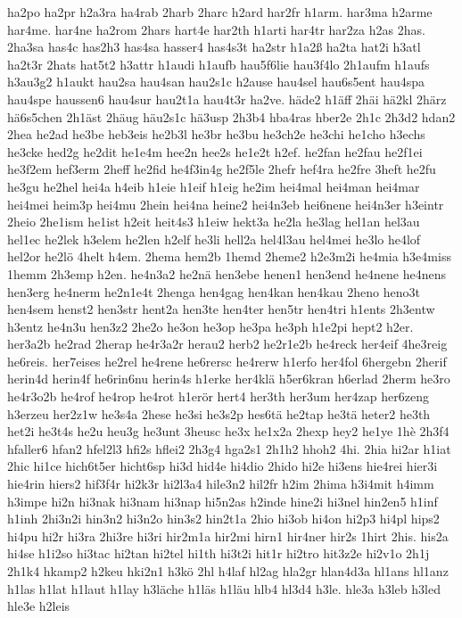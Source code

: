 {ha2po
ha2pr
h2a3ra
ha4rab
2harb
2harc
h2ard
har2fr
h1arm.
har3ma
h2arme
har4me.
har4ne
ha2rom
2hars
hart4e
har2th
h1arti
har4tr
har2za
h2as
2has.
2ha3sa
has4c
has2h3
has4sa
hasser4
has4s3t
ha2str
h1a2ß
ha2ta
hat2i
h3atl
ha2t3r
2hats
hat5t2
h3attr
h1audi
h1aufb
hau5f6lie
hau3f4lo
2h1aufm
h1aufs
h3au3g2
h1aukt
hau2sa
hau4san
hau2s1c
h2ause
hau4sel
hau6s5ent
hau4spa
hau4spe
haussen6
hau4sur
hau2t1a
hau4t3r
ha2ve.
häde2
h1äff
2häi
hä2kl
2härz
hä6s5chen
2h1äst
2häug
häu2s1c
hä3usp
2h3b4
hba4ras
hber2e
2h1c
2h3d2
hdan2
2hea
he2ad
he3be
heb3eis
he2b3l
he3br
he3bu
he3ch2e
he3chi
he1cho
h3echs
he3cke
hed2g
he2dit
he1e4m
hee2n
hee2s
he1e2t
h2ef.
he2fan
he2fau
he2f1ei
he3f2em
hef3erm
2heff
he2fid
he4f3in4g
he2f5le
2hefr
hef4ra
he2fre
3heft
he2fu
he3gu
he2hel
hei4a
h4eib
h1eie
h1eif
h1eig
he2im
hei4mal
hei4man
hei4mar
hei4mei
heim3p
hei4mu
2hein
hei4na
heine2
hei4n3eb
hei6nene
hei4n3er
h3eintr
2heio
2he1ism
he1ist
h2eit
heit4s3
h1eiw
hekt3a
he2la
he3lag
hel1an
hel3au
hel1ec
he2lek
h3elem
he2len
h2elf
he3li
hell2a
hel4l3au
hel4mei
he3lo
he4lof
hel2or
he2lö
4helt
h4em.
2hema
hem2b
1hemd
2heme2
h2e3m2i
he4mia
h3e4miss
1hemm
2h3emp
h2en.
he4n3a2
he2nä
hen3ebe
henen1
hen3end
he4nene
he4nens
hen3erg
he4nerm
he2n1e4t
2henga
hen4gag
hen4kan
hen4kau
2heno
heno3t
hen4sem
henst2
hen3str
hent2a
hen3te
hen4ter
hen5tr
hen4tri
h1ents
2h3entw
h3entz
he4n3u
hen3z2
2he2o
he3on
he3op
he3pa
he3ph
h1e2pi
hept2
h2er.
her3a2b
he2rad
2herap
he4r3a2r
herau2
herb2
he2r1e2b
he4reck
her4eif
4he3reig
he6reis.
her7eises
he2rel
he4rene
he6rersc
he4rerw
h1erfo
her4fol
6hergebn
2herif
herin4d
herin4f
he6rin6nu
herin4s
h1erke
her4klä
h5er6kran
h6erlad
2herm
he3ro
he4r3o2b
he4rof
he4rop
he4rot
h1erör
hert4
her3th
her3um
her4zap
her6zeng
h3erzeu
her2z1w
he3s4a
2hese
he3si
he3s2p
hes6tä
he2tap
he3tä
heter2
he3th
het2i
he3t4s
he2u
heu3g
he3unt
3heusc
he3x
he1x2a
2hexp
hey2
he1ye
1hè
2h3f4
hfaller6
hfan2
hfel2l3
hfi2s
hflei2
2h3g4
hga2s1
2h1h2
hhoh2
4hi.
2hia
hi2ar
h1iat
2hic
hi1ce
hich6t5er
hicht6sp
hi3d
hid4e
hi4dio
2hido
hi2e
hi3ens
hie4rei
hier3i
hie4rin
hiers2
hif3f4r
hi2k3r
hi2l3a4
hile3n2
hil2fr
h2im
2hima
h3i4mit
h4imm
h3impe
hi2n
hi3nak
hi3nam
hi3nap
hi5n2as
h2inde
hine2i
hi3nel
hin2en5
h1inf
h1inh
2hi3n2i
hin3n2
hi3n2o
hin3s2
hin2t1a
2hio
hi3ob
hi4on
hi2p3
hi4pl
hips2
hi4pu
hi2r
hi3ra
2hi3re
hi3ri
hir2m1a
hir2mi
hirn1
hir4ner
hir2s
1hirt
2his.
his2a
hi4se
h1i2so
hi3tac
hi2tan
hi2tel
hi1th
hi3t2i
hit1r
hi2tro
hit3z2e
hi2v1o
2h1j
2h1k4
hkamp2
h2keu
hki2n1
h3kö
2hl
h4laf
hl2ag
hla2gr
hlan4d3a
hl1ans
hl1anz
h1las
h1lat
h1laut
h1lay
h3läche
h1läs
h1läu
hlb4
hl3d4
h3le.
hle3a
h3leb
h3led
hle3e
h2leis
}
